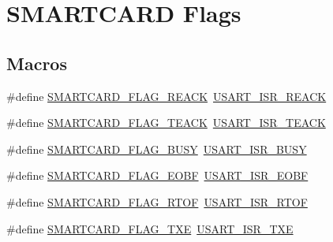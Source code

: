 \hypertarget{group___s_m_a_r_t_c_a_r_d___flags}{}\section{S\+M\+A\+R\+T\+C\+A\+RD Flags}
\label{group___s_m_a_r_t_c_a_r_d___flags}
\subsection*{Macros}
\begin{DoxyCompactItemize}
\item 
\#define \hyperlink{group___s_m_a_r_t_c_a_r_d___flags_gabb3eb671a5452cce3359b04cd6ed0f28}{S\+M\+A\+R\+T\+C\+A\+R\+D\+\_\+\+F\+L\+A\+G\+\_\+\+R\+E\+A\+CK}~\hyperlink{group___peripheral___registers___bits___definition_gaa513c61dd111de0945d8dd0778e70ad5}{U\+S\+A\+R\+T\+\_\+\+I\+S\+R\+\_\+\+R\+E\+A\+CK}
\item 
\#define \hyperlink{group___s_m_a_r_t_c_a_r_d___flags_ga7f6964385a9b7f2e3f69c8beabd66da9}{S\+M\+A\+R\+T\+C\+A\+R\+D\+\_\+\+F\+L\+A\+G\+\_\+\+T\+E\+A\+CK}~\hyperlink{group___peripheral___registers___bits___definition_gaf1433ae77d20ec6da645117cde536f81}{U\+S\+A\+R\+T\+\_\+\+I\+S\+R\+\_\+\+T\+E\+A\+CK}
\item 
\#define \hyperlink{group___s_m_a_r_t_c_a_r_d___flags_ga83d6ea48b1b2efda916d8a29acdd388b}{S\+M\+A\+R\+T\+C\+A\+R\+D\+\_\+\+F\+L\+A\+G\+\_\+\+B\+U\+SY}~\hyperlink{group___peripheral___registers___bits___definition_gafb7fb858e7f0dec99740570ecfb922cc}{U\+S\+A\+R\+T\+\_\+\+I\+S\+R\+\_\+\+B\+U\+SY}
\item 
\#define \hyperlink{group___s_m_a_r_t_c_a_r_d___flags_ga84a738c8b03a673350e438d577e84179}{S\+M\+A\+R\+T\+C\+A\+R\+D\+\_\+\+F\+L\+A\+G\+\_\+\+E\+O\+BF}~\hyperlink{group___peripheral___registers___bits___definition_ga32ba49f7fad9ab499c6f2a1a1780c904}{U\+S\+A\+R\+T\+\_\+\+I\+S\+R\+\_\+\+E\+O\+BF}
\item 
\#define \hyperlink{group___s_m_a_r_t_c_a_r_d___flags_gac05fb1d4e23907a7fbedea32b2b4f301}{S\+M\+A\+R\+T\+C\+A\+R\+D\+\_\+\+F\+L\+A\+G\+\_\+\+R\+T\+OF}~\hyperlink{group___peripheral___registers___bits___definition_ga09f8a368294fb6a5c47de1193484f3b8}{U\+S\+A\+R\+T\+\_\+\+I\+S\+R\+\_\+\+R\+T\+OF}
\item 
\#define \hyperlink{group___s_m_a_r_t_c_a_r_d___flags_ga5ac591d03dcadd10c53f6d586a0e485c}{S\+M\+A\+R\+T\+C\+A\+R\+D\+\_\+\+F\+L\+A\+G\+\_\+\+T\+XE}~\hyperlink{group___peripheral___registers___bits___definition_gab59be9f02a6e304a82da3e298c6a72ab}{U\+S\+A\+R\+T\+\_\+\+I\+S\+R\+\_\+\+T\+XE}

\end{DoxyCompactItemize}
